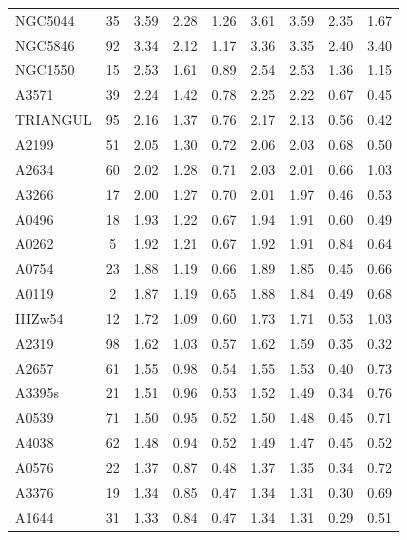 \documentclass[10pt,aps,pra,reprint,amsmath,amsfonts,amssymb,showpacs,nofootinbib,floatfix]{revtex4-1}
\newcommand{\vstt}{\vspace{-0.0mm}}
\begin{document}
\begin{table}
\begin{minipage}{2.0\columnwidth}
\begin{tabular}{l c c c c c c c c}
NGC5044  &  35 &   3.59 &   2.28 &   1.26 &   3.61 &   3.59 &   2.35 &   1.67 \vstt \\
NGC5846  &  92 &   3.34 &   2.12 &   1.17 &   3.36 &   3.35 &   2.40 &   3.40 \vstt \\
NGC1550  &  15 &   2.53 &   1.61 &   0.89 &   2.54 &   2.53 &   1.36 &   1.15 \vstt \\
A3571    &  39 &   2.24 &   1.42 &   0.78 &   2.25 &   2.22 &   0.67 &   0.45 \vstt \\
TRIANGUL &  95 &   2.16 &   1.37 &   0.76 &   2.17 &   2.13 &   0.56 &   0.42 \vstt \\
A2199    &  51 &   2.05 &   1.30 &   0.72 &   2.06 &   2.03 &   0.68 &   0.50 \vstt \\
A2634    &  60 &   2.02 &   1.28 &   0.71 &   2.03 &   2.01 &   0.66 &   1.03 \vstt \\
A3266    &  17 &   2.00 &   1.27 &   0.70 &   2.01 &   1.97 &   0.46 &   0.53 \vstt \\
A0496    &  18 &   1.93 &   1.22 &   0.67 &   1.94 &   1.91 &   0.60 &   0.49 \vstt \\
A0262    &   5 &   1.92 &   1.21 &   0.67 &   1.92 &   1.91 &   0.84 &   0.64 \vstt \\
A0754    &  23 &   1.88 &   1.19 &   0.66 &   1.89 &   1.85 &   0.45 &   0.66 \vstt \\
A0119    &   2 &   1.87 &   1.19 &   0.65 &   1.88 &   1.84 &   0.49 &   0.68 \vstt \\
IIIZw54  &  12 &   1.72 &   1.09 &   0.60 &   1.73 &   1.71 &   0.53 &   1.03 \vstt \\
A2319    &  98 &   1.62 &   1.03 &   0.57 &   1.62 &   1.59 &   0.35 &   0.32 \vstt \\
A2657    &  61 &   1.55 &   0.98 &   0.54 &   1.55 &   1.53 &   0.40 &   0.73 \vstt \\
A3395s   &  21 &   1.51 &   0.96 &   0.53 &   1.52 &   1.49 &   0.34 &   0.76 \vstt \\
A0539    &  71 &   1.50 &   0.95 &   0.52 &   1.50 &   1.48 &   0.45 &   0.71 \vstt \\
A4038    &  62 &   1.48 &   0.94 &   0.52 &   1.49 &   1.47 &   0.45 &   0.52 \vstt \\
A0576    &  22 &   1.37 &   0.87 &   0.48 &   1.37 &   1.35 &   0.34 &   0.72 \vstt \\
A3376    &  19 &   1.34 &   0.85 &   0.47 &   1.34 &   1.31 &   0.30 &   0.69 \vstt \\
A1644    &  31 &   1.33 &   0.84 &   0.47 &   1.34 &   1.31 &   0.29 &   0.51 \vstt \\

\end{tabular}
\end{minipage}
\end{table}
\end{document}
